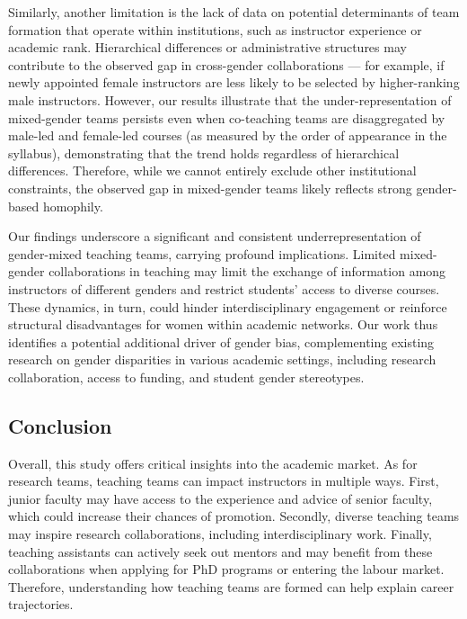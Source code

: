 \documentclass[
  12pt,
]{article}
\begin{document}
Similarly, another limitation is the lack of data on potential determinants of team formation that operate within institutions, such as instructor experience or academic rank. Hierarchical differences or administrative structures may contribute to the observed gap in cross-gender collaborations --- for example, if newly appointed female instructors are less likely to be selected by higher-ranking male instructors. However, our results illustrate that the under-representation of mixed-gender teams persists even when co-teaching teams are disaggregated by male-led and female-led courses (as measured by the order of appearance in the syllabus), demonstrating that the trend holds regardless of hierarchical differences. Therefore, while we cannot entirely exclude other institutional constraints, the observed gap in mixed-gender teams likely reflects strong gender-based homophily.

Our findings underscore a significant and consistent underrepresentation of gender-mixed teaching teams, carrying profound implications. Limited mixed-gender collaborations in teaching may limit the exchange of information among instructors of different genders and restrict students' access to diverse courses. These dynamics, in turn, could hinder interdisciplinary engagement or reinforce structural disadvantages for women within academic networks. Our work thus identifies a potential additional driver of gender bias, complementing existing research on gender disparities in various academic settings, including research collaboration, access to funding, and student gender stereotypes.

\subsection{Conclusion}\label{conclusion}

Overall, this study offers critical insights into the academic market. As for research teams, teaching teams can impact instructors in multiple ways. First, junior faculty may have access to the experience and advice of senior faculty, which could increase their chances of promotion. Secondly, diverse teaching teams may inspire research collaborations, including interdisciplinary work. Finally, teaching assistants can actively seek out mentors and may benefit from these collaborations when applying for PhD programs or entering the labour market. Therefore, understanding how teaching teams are formed can help explain career trajectories.

\newpage
\processdelayedfloats
\end{document}
